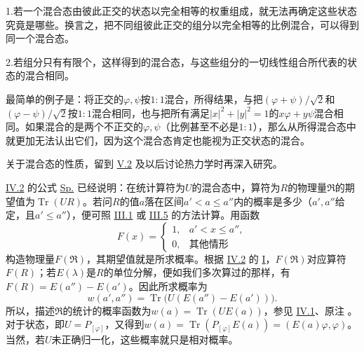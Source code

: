 \documentclass[fontsize=13pt,twoside,openany,headings=normal,parskip=false,bookmarkpackage=false,DIV=calc]{scrbook}
\begin{document}
\noindent1.若一个混合态由彼此正交的状态以完全相等的权重组成，就无法再确定这些状态究竟是哪些。换言之，把不同组彼此正交的组分以完全相等的\hypertarget{origpage-176}{}\label{origpage-176}比例混合，可以得到同一个混合态。

\noindent2.若组分只有有限个，这样得到的混合态，与这些组分的一切线性组合所代表的状态的混合相同。

最简单的例子是：将正交的$\varphi,\allowbreak \psi$按$1:1$混合，所得结果，与把$(\varphi+\psi)/\sqrt2$和$(\varphi-\psi)/\sqrt2$按$1:1$混合相同，也与把所有满足$|x|^2+|y|^2=1$的$x\varphi+y\psi$混合相同。如果混合的是两个不正交的$\varphi,\allowbreak \psi$（比例甚至不必是$1:1$），那么从所得混合态中就更加无法认出它们，因为这个混合态肯定也能视为正交状态的混合。

关于混合态的性质，留到 \hyperref[sec:V.2]{V.2} 及以后讨论热力学时再深入研究。

\hyperref[sec:IV.2]{IV.2} 的公式 \hyperref[eq:IV.2.Sp]{Sp.} 已经说明：在统计算符为$U$的混合态中，算符为$R$的物理量$\mathfrak R$的期望值为$\operatorname{Tr}(UR)$。若问$R$的值$a$落在区间$a'<a\leq a''$内的概率是多少（$a',\allowbreak a''$给定，且$a'\leq a''$），便可照 \hyperref[sec:III.1]{III.1} 或 \hyperref[sec:III.5]{III.5} 的方法计算。用函数
\[
F(x)=\begin{cases}1,&a'<x\leq a'',\\0,&\text{其他情形}\end{cases}
\]
构造物理量$F(\mathfrak R)$，其期望值就是所求概率。根据 \hyperref[sec:IV.2]{IV.2} 的 \hyperref[cond:IV.2.I]{I}，$F(\mathfrak R)$对应算符$F(R)$；若$E(\lambda)$是$R$的单位分解，便如我们多次算过的那样，有$F(R)=E(a'')-E(a')$。因此所求概率为
\[
w(a',a'')=\operatorname{Tr}\bigl(U(E(a'')-E(a'))\bigr).
\]
所以，描述$\mathfrak R$的统计的概率函数为$w(a)=\operatorname{Tr}(UE(a))$，参见 \hyperref[sec:IV.1]{IV.1}、原注 \hyperlink{note-175}{}。对于状态，即$U=P_{[\varphi]}$，又得到$w(a)=\operatorname{Tr}(P_{[\varphi]}E(a))=(E(a)\varphi,\allowbreak \varphi)$。当然，若$U$未正确归一化，这些概率就只是相对概率。
\end{document}

